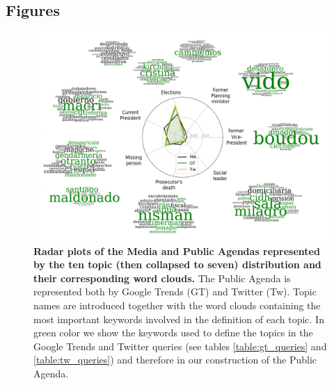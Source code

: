 \documentclass{bmcart}
\begin{document}
\begin{backmatter}

\section*{Figures}

\begin{figure}[h!]
\includegraphics[width = \textwidth]{Fig1.pdf}
\caption{\textbf{Radar plots of the Media and Public Agendas represented by the ten topic (then collapsed to seven) distribution and their corresponding word clouds.} The Public Agenda is represented both by Google Trends (GT) and Twitter (Tw). Topic names are introduced together with the word clouds containing the most important keywords involved in the definition of each topic. In green color we show the keywords used to define the topics in the Google Trends and Twitter queries (see tables \ref{table:gt_queries} and \ref{table:tw_queries}) and therefore in our construction of the Public Agenda.}
\label{fig:topics_wordclouds}
\end{figure}


\end{backmatter}
\end{document}
